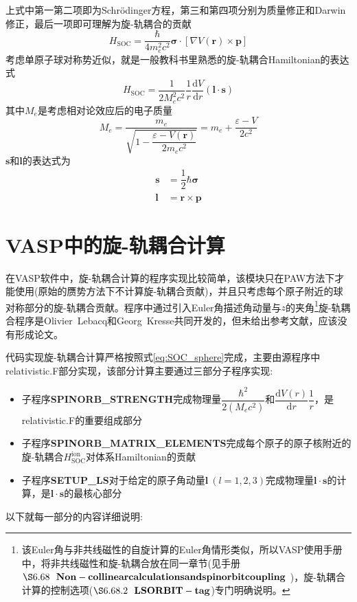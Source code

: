 \documentclass[10pt, oneside, a4paper]{article}      %
\begin{document}
上式中第一第二项即为\textrm{Schr\"odinger}方程，第三和第四项分别为质量修正和\textrm{Darwin}修正，最后一项即可理解为旋-轨耦合的贡献
\begin{equation}
	H_{\mathrm{SOC}}=\dfrac{\hbar}{4m_e^2c^2}{\bm\sigma}\cdot[\nabla V(\mathbf{r})\times\mathbf{p}]
	\label{eq:SOC_Hamilton}
\end{equation}
考虑单原子球对称势近似，就是一般教科书里熟悉的旋-轨耦合\textrm{Hamiltonian}的表达式
\begin{equation}
	H_{\mathrm{SOC}}=\dfrac1{2M_e^2c^2}\dfrac1r\dfrac{\mathrm{d}V}{\mathrm{d}r}(\mathbf{l}\cdot\mathbf{s})
	\label{eq:SOC_sphere}
\end{equation}
其中$M_e$是考虑相对论效应后的电子质量
\begin{displaymath}
	M_e = \dfrac{m_e}{\sqrt{1-\dfrac{\varepsilon-V(\mathbf{r})}{2m_ec^2}}}=m_e+\dfrac{\varepsilon-V}{2c^2}
\end{displaymath}
$\mathbf{s}$和$\mathbf{l}$的表达式为
\begin{displaymath}
	\begin{aligned}
		\mathbf{s}&=\dfrac12\hbar\bm\sigma\\
		\mathbf{l}&=\mathbf{r}\times\mathbf{p}
	\end{aligned}
\end{displaymath}

\section{\rm{VASP}中的旋-轨耦合计算}
在\textrm{VASP}软件中，旋-轨耦合计算的程序实现比较简单，该模块只在\textrm{PAW}方法下才能使用(原始的赝势方法下不计算旋-轨耦合贡献)，并且只考虑每个原子附近的球对称部分的旋-轨耦合贡献。程序中通过引入\textrm{Euler}角描述角动量与$z$的夹角\footnote{该\textrm{Euler}角与非共线磁性的自旋计算的\textrm{Euler}角情形类似，所以\textrm{VASP}使用手册中，将非共线磁性和旋-轨耦合放在同一章节(见手册$\S 6.68~~\mathbf{Non-collinear calculations and spin orbit coupling}$ )，旋-轨耦合计算的控制选项($\S 6.68.2~~\mathbf{LSORBIT-tag}$)专门明确说明。}旋-轨耦合程序是\textrm{Olivier~Lebacq}和\textrm{Georg~Kresse}共同开发的，但未给出参考文献，应该没有形成论文。

代码实现旋-轨耦合计算严格按照式\eqref{eq:SOC_sphere}完成，主要由源程序中\textrm{relativistic.F}部分实现，该部分计算主要通过三部分子程序实现:
\begin{itemize}
	\item 子程序\textbf{SPINORB\_STRENGTH}完成物理量$\dfrac{\hbar^2}{2(M_ec^2)}$和$\dfrac{\mathrm{d}V(r)}{\mathrm{d}r}\dfrac1r$，是\textrm{relativistic.F}的重要组成部分
	\item 子程序\textbf{SPINORB\_MATRIX\_ELEMENTS}完成每个原子的原子核附近的旋-轨耦合$H_{\mathrm{SOC}}^{\mathrm{ion}}$对体系\textrm{Hamiltonian}的贡献
	\item 子程序\textbf{SETUP\_LS}对于给定的原子角动量$\mathbf{l}~(l=1,2,3)$完成物理量$\mathbf{l}\cdot\mathbf{s}$的计算，是$\mathbf{l}\cdot\mathbf{s}$的最核心部分
\end{itemize}
以下就每一部分的内容详细说明:
\end{document}
